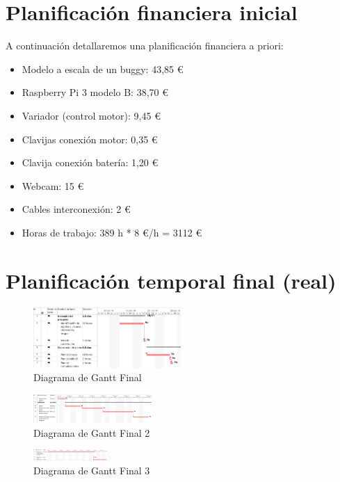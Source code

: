 \documentclass{pclass}
\begin{document}
\section{Planificación financiera inicial} 
A continuación detallaremos una planificación financiera a priori:
\begin{itemize}
    \item Modelo a escala de un buggy: 43,85 \euro
    \item Raspberry Pi 3 modelo B: 38,70 \euro
    \item Variador (control motor): 9,45 \euro
    \item Clavijas conexión motor: 0,35 \euro
    \item Clavija conexión batería: 1,20 \euro
    \item Webcam: 15 \euro
    \item Cables interconexión: 2 \euro
    \item Horas de trabajo: 389 h * 8 \euro/h = 3112 \euro

\end{itemize}

\section{Planificación temporal final (real)}

\begin{figure}[H]
	\centering
	\includegraphics[angle=270,width=0.5\textwidth]{img/ganttFinal}
	\caption{Diagrama de Gantt Final}
	\label{fig:ganttFinal}
\end{figure} 

\begin{figure}[H]
	\centering
	\includegraphics[angle=270,width=0.4\textwidth]{img/ganttFinal2}
	\caption{Diagrama de Gantt Final 2}
	\label{fig:ganttFinal2}
\end{figure}

\begin{figure}[H]
	\centering
	\includegraphics[angle=270,width=0.25\textwidth]{img/ganttFinal3}
	\caption{Diagrama de Gantt Final 3}
	\label{fig:ganttFinal3}
\end{figure}
\end{document}
